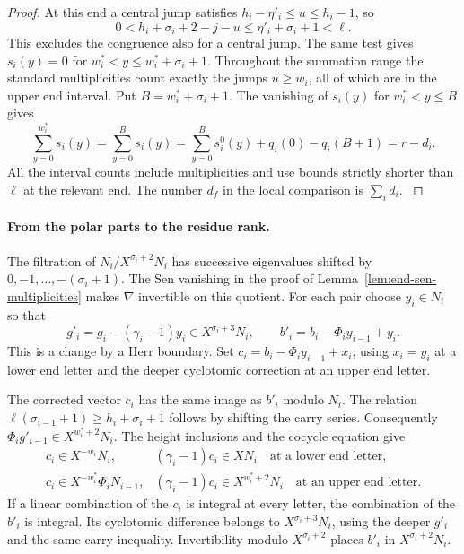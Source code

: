 \begin{proof}
At this end a central jump satisfies \(h_i-\eta'_i\le u\le h_i-1\), so
\[
 0<h_i+\sigma_i+2-j-u\le\eta'_i+\sigma_i+1<\ell .
\]
This excludes the congruence also for a central jump. The same test gives
\(s_i(y)=0\) for \(w_i^*<y\le w_i^*+\sigma_i+1\).
Throughout the summation range the standard multiplicities
count exactly the jumps \(u\ge w_i\), all of which are in
the upper end interval. Put \(B=w_i^*+\sigma_i+1\). The vanishing of
\(s_i(y)\) for \(w_i^*<y\le B\) gives
\[
 \sum_{y=0}^{w_i^*}s_i(y)=\sum_{y=0}^{B}s_i(y)
     =\sum_{y=0}^{B}s_i^0(y)+q_i(0)-q_i(B+1)=r-d_i .
\]
All the interval counts include multiplicities and use bounds
strictly shorter than \(\ell\) at the relevant end. The number
\(d_f\) in the local comparison is \(\sum_i d_i\).
\label{cor:residue-model-length-4}
\end{proof}

\paragraph{From the polar parts to the residue rank.}
The filtration of \(N_i/X^{\sigma_i+2}N_i\) has successive
eigenvalues shifted by \(0,-1,\ldots,-(\sigma_i+1)\).
The Sen vanishing in the proof of Lemma~\ref{lem:end-sen-multiplicities}
makes \(\nabla\) invertible on this quotient.
For each pair choose \(y_i\in N_i\) so that
\[
 g'_i=g_i-(\gamma_i-1)y_i\in X^{\sigma_i+3}N_i,\qquad
 b'_i=b_i-\Phi_i y_{i-1}+y_i .
\]
This is a change by a Herr boundary.
Set \(c_i=b_i-\Phi_i y_{i-1}+x_i\), using \(x_i=y_i\)
at a lower end letter and the deeper cyclotomic correction
at an upper end letter.

The corrected vector \(c_i\) has the same image as \(b'_i\)
modulo \(N_i\).
The relation \(\ell(\sigma_{i-1}+1)\ge h_i+\sigma_i+1\)
follows by shifting the carry series. Consequently
\(\Phi_i g'_{i-1}\in X^{w_i^*+2}N_i\).
The height inclusions and the cocycle equation give
\[
\begin{array}{ll}
c_i\in X^{-w_i}N_i,&(\gamma_i-1)c_i\in XN_i
       \quad\text{at a lower end letter},\\
c_i\in X^{-w_i^*}\Phi_i N_{i-1},&
(\gamma_i-1)c_i\in X^{w_i^*+2}N_i
       \quad\text{at an upper end letter}.
\end{array}
\]
If a linear combination of the \(c_i\) is integral at
every letter, the combination of the \(b'_i\) is integral.
Its cyclotomic difference belongs to \(X^{\sigma_i+3}N_i\),
using the deeper \(g'_i\) and the same carry inequality.
Invertibility modulo \(X^{\sigma_i+2}\) places \(b'_i\) in
\(X^{\sigma_i+2}N_i\).


